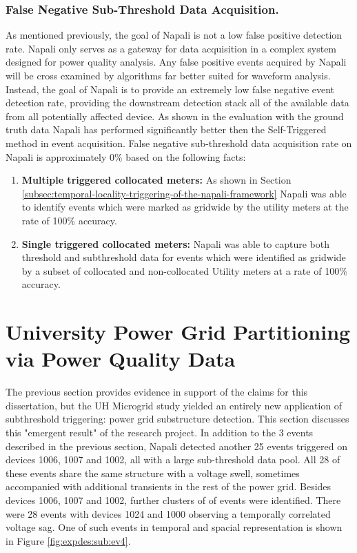\subsubsection{False Negative Sub-Threshold Data Acquisition.}

As mentioned previously, the goal of Napali is not a low false positive detection rate.
Napali only serves as a gateway for data acquisition in a complex system designed for power quality analysis.
Any false positive events acquired by Napali will be cross examined by algorithms far better suited for waveform analysis.
Instead, the goal of Napali is to provide an extremely low false negative event detection rate, providing the downstream detection stack all of the available data from all potentially affected device.
As shown in the evaluation with the ground truth data Napali has performed significantly better then the Self-Triggered method in event acquisition.
False negative sub-threshold data acquisition rate on Napali is approximately 0\% based on the following facts:
\begin{enumerate}
    \item \textbf{Multiple triggered collocated meters:} As shown in Section \ref{subsec:temporal-locality-triggering-of-the-napali-framework} Napali was able to identify events which were marked as gridwide by the utility meters at the rate of 100\% accuracy.
    \item \textbf{Single triggered collocated meters:} Napali was able to capture both threshold and subthreshold data for events which were identified as gridwide by a subset of collocated and non-collocated Utility meters at a rate of 100\% accuracy.
\end{enumerate}

\section{University Power Grid Partitioning via Power Quality Data}\label{sec:university-power-grid-partitioning-via-power-quality-data}

The previous section provides evidence in support of the claims for this dissertation, but the UH Microgrid study yielded an entirely new application of subthreshold triggering: power grid substructure detection.
This section discusses this "emergent result" of the research project.
In addition to the 3 events described in the previous section, Napali detected another 25 events triggered on devices 1006, 1007 and 1002, all with a large sub-threshold data pool.
All 28 of these events share the same structure with a voltage swell, sometimes accompanied with additional transients in the rest of the power grid.
Besides devices 1006, 1007 and 1002, further clusters of of events were identified.
There were 28 events with devices 1024 and 1000 observing a temporally correlated voltage sag.
One of such events in temporal and spacial representation is shown in Figure \ref{fig:expdes:sub:ev4}.

